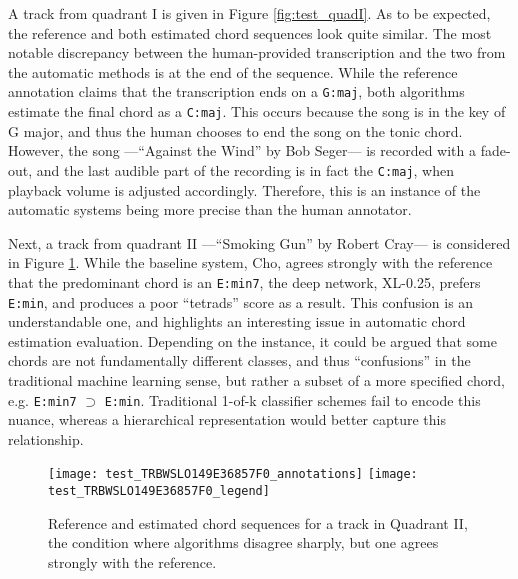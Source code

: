 A track from quadrant I is given in Figure \ref{fig:test_quadI}.
As to be expected, the reference and both estimated chord sequences look quite similar.
The most notable discrepancy between the human-provided transcription and the two from the automatic methods is at the end of the sequence.
While the reference annotation claims that the transcription ends on a \texttt{G:maj}, both algorithms estimate the final chord as a \texttt{C:maj}.
This occurs because the song is in the key of G major, and thus the human chooses to end the song on the tonic chord.
However, the song ---``Against the Wind'' by Bob Seger--- is recorded with a fade-out, and the last audible part of the recording is in fact the \texttt{C:maj}, when playback volume is adjusted accordingly.
Therefore, this is an instance of the automatic systems being more precise than the human annotator.


Next, a track from quadrant II ---``Smoking Gun'' by Robert Cray--- is considered in Figure \ref{fig:test_quadII}.
While the baseline system, Cho, agrees strongly with the reference that the predominant chord is an \texttt{E:min7}, the deep network, XL-0.25, prefers \texttt{E:min}, and produces a poor ``tetrads'' score as a result.
This confusion is an understandable one, and highlights an interesting issue in automatic chord estimation evaluation.
Depending on the instance, it could be argued that some chords are not fundamentally different classes, and thus ``confusions'' in the traditional machine learning sense, but rather a subset of a more specified chord, e.g. \texttt{E:min7} $\supset$ \texttt{E:min}.
Traditional 1-of-k classifier schemes fail to encode this nuance, whereas a hierarchical representation would better capture this relationship.

\begin{figure}[t!]
\centering
\texttt{[image: test\_TRBWSLO149E36857F0\_annotations]}
\texttt{[image: test\_TRBWSLO149E36857F0\_legend]}
\caption{Reference and estimated chord sequences for a track in Quadrant II, the condition where algorithms disagree sharply, but one agrees strongly with the reference.}
\label{fig:test_quadII}
\end{figure}

